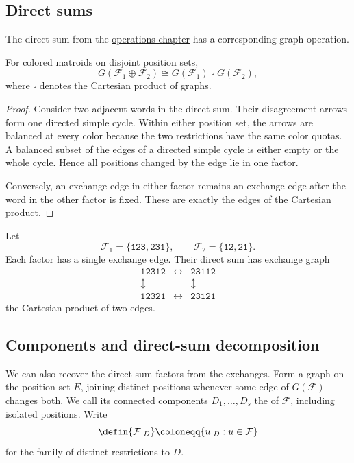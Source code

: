 \subsection[directSumGraphs]{Direct sums}

The direct sum from the \href{operations.htm}{operations chapter} has a
corresponding graph operation.

\begin{proposition}
For colored matroids on disjoint position sets,
\[
 G(\mathcal F_1\oplus\mathcal F_2)
 \cong
 G(\mathcal F_1)\mathbin{\square}G(\mathcal F_2),
\]
where $\square$ denotes the Cartesian product of graphs.
\end{proposition}

\begin{proof}
Consider two adjacent words in the direct sum. Their disagreement arrows form
one directed simple cycle. Within either position set, the arrows are balanced
at every color because the two restrictions have the same color quotas. A
balanced subset of the edges of a directed simple cycle is either empty or the
whole cycle. Hence all positions changed by the edge lie in one factor.

Conversely, an exchange edge in either factor remains an exchange edge after
the word in the other factor is fixed. These are exactly the edges of the
Cartesian product.
\end{proof}

\begin{example}[A square]
Let
\[
 \mathcal F_1=\{\mathtt{123},\mathtt{231}\},
 \qquad
 \mathcal F_2=\{\mathtt{12},\mathtt{21}\}.
\]
Each factor has a single exchange edge. Their direct sum has exchange graph
\[
 \begin{array}{ccc}
 \mathtt{12312}&\longleftrightarrow&\mathtt{23112}\\
 \updownarrow&&\updownarrow\\
 \mathtt{12321}&\longleftrightarrow&\mathtt{23121}
 \end{array}
\]
the Cartesian product of two edges.
\end{example}

\subsection[components]{Components and direct-sum decomposition}

We can also recover the direct-sum factors from the exchanges. Form a graph
on the position set $E$, joining distinct positions whenever some edge of
$G(\mathcal F)$ changes both. We call its connected components
$D_1,\dotsc,D_s$ the  of $\mathcal F$, including isolated
positions. Write
\[
 \defin{\mathcal F|_D}\coloneqq\{u|_D:u\in\mathcal F\}
\]
for the family of distinct restrictions to $D$.

